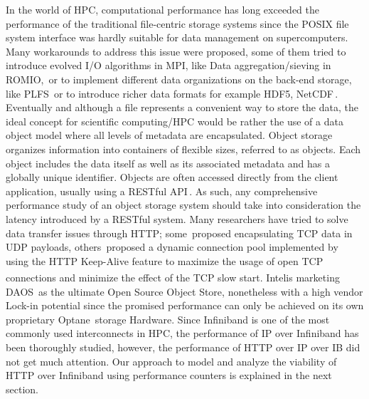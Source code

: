 \documentclass[runningheads]{llncs}
\begin{document}
In the world of HPC, computational performance has long exceeded the performance of the traditional file-centric storage systems since the POSIX file system interface was hardly suitable for data management on supercomputers\cite{zadok2017posix}.
Many workarounds to address this issue were proposed, some of them tried to introduce evolved I/O algorithms in MPI, like Data aggregation/sieving in ROMIO,\,\cite{datasievingromio} or to implement different data organizations on the back-end storage, like PLFS\,\cite{bent2009plfs} or to introduce richer data formats for example HDF5, NetCDF\,\cite{hdf5}.
Eventually and although a file represents a convenient way to store the data, the ideal concept for scientific computing/HPC would be rather the use of a data object model\cite{liu2018evaluation} where all levels of metadata are encapsulated. 
Object storage organizes information into containers of flexible sizes, referred to as objects. Each object includes the data itself as well as its associated metadata and has a globally unique identifier.
Objects are often accessed directly from the client application, usually using a RESTful API\,\cite{richardson2008restful}.
As such, any comprehensive performance study of an object storage system should take into consideration the latency introduced by a RESTful system.
Many researchers have tried to solve data transfer issues through HTTP; some\,\cite{forest} proposed encapsulating TCP data in UDP payloads, others\,\cite {Devresse} proposed a dynamic connection pool implemented by using the HTTP Keep-Alive feature to maximize the usage of open TCP connections and minimize the effect of the TCP slow start. Intel\textsuperscript \textregistered  is marketing DAOS\,\cite{DAOS} as the ultimate Open Source Object Store, nonetheless with a high vendor Lock-in potential since the promised performance can only be achieved on its own proprietary Optane\,\cite{Optane} storage Hardware.
Since Infiniband \cite{Infiniband} is one of the most commonly used interconnects in HPC, the performance of IP over Infiniband \cite{bortolotti2011comparison,grant2010study} has been thoroughly studied, however, the performance of HTTP over IP over IB did not get much attention. Our approach to model and analyze the viability of HTTP over Infiniband using performance counters is explained in the next section.
\end{document}
